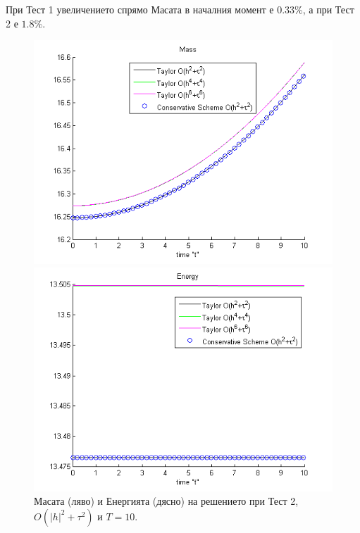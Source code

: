 \documentclass{article}
\begin{document}
При Тест 1 увеличението спрямо Масата в началния момент е $0.33\%$, а при Тест 2 е $1.8\%$.

\begin{figure}[ht]\vspace{0.2cm}
	\begin{minipage}[b]{0.4\linewidth}
		 \includegraphics[width=\linewidth]{../amitans/figures/Mass_bt1_c090_h010_Taylor_Conservative.png}
	\end{minipage}	
	\begin{minipage}[b]{0.4\linewidth}
		\includegraphics[width=\linewidth]{../amitans/figures/Energy_bt1_c090_h010_Taylor_Conservative.png}
		
	\end{minipage}
\caption{Масата (ляво) и Енергията (дясно) на решението при Тест 2, $O(|h|^2 + \tau^2)$ и $T=10$.}
\label{Test2En}
\end{figure}
\end{document}
